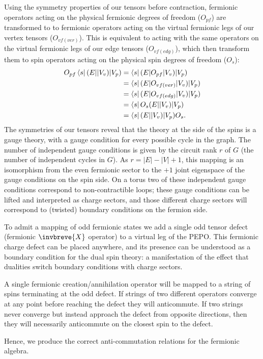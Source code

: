\documentclass[aps,prl,twocolumn,floatfix,10pt,amssymb,amsfont,amsmath,superscriptaddress,float,nofootinbib,longbibliography,nobalancelastpage]{revtex4-2}
\begin{document}
Using the symmetry properties of our tensors before contraction, fermionic operators acting on the physical fermionic degrees of freedom ($O_{pf}$) are transformed to to fermionic operators acting on the virtual fermionic legs of our vertex tensors ($O_{vf (ver)}$). This is equivalent to acting with the same operators on the virtual fermionic legs of our edge tensors ($O_{vf (edg)}$), which then transform them to spin operators acting on the physical spin degrees of freedom ($O_{s}$):
\begin{align*}
    O_{pf}\bra{s}(E|  |V_v)|V_p) &= \bra{s}(E|O_{pf}  |V_v)|V_p)\\
    &= \bra{s}(E| O_{vf (ver)}|V_v)|V_p)\\ 
    &= \bra{s}(E| O_{vf (edg)}|V_v)|V_p)\\
    &= \bra{s}O_s(E| |V_v)|V_p) \\
    &= \bra{s}(E| |V_v)|V_p)O_s.
\end{align*}
The symmetries of our tensors reveal that the theory at the side of the spins is a gauge theory, with a gauge condition for every possible cycle in the graph. The number of independent gauge conditions is given by the circuit rank $r$ of $G$ (the number of independent cycles in $G$). As $r = |E| - |V| + 1$, this mapping is an isomorphism from the even fermionic sector to the $+1$ joint eigenspace of the gauge conditions on the spin side. On a torus two of these independent gauge conditions correspond to non-contractible loops; these gauge conditions can be lifted and interpreted as charge sectors, and those different charge sectors will correspond to (twisted) boundary conditions on the fermion side.


To admit a mapping of odd fermionic states we add a single odd tensor defect (fermionic $\invbreve{X}$ operator) to a virtual leg of the PEPO. This fermionic charge defect can be placed anywhere, and its presence can be understood as a boundary condition for the dual spin theory: a manifestation of the effect that dualities switch boundary conditions with charge sectors. 

A single fermionic creation/annihilation operator will be mapped to a string of spins terminating at the odd defect. If strings of two different operators converge at any point before reaching the defect they will anticommute. If two strings never converge but instead approach the defect from opposite directions, then they will necessarily anticommute on the closest spin to the defect. 

Hence, we produce the correct anti-commutation relations for the fermionic algebra.
\end{document}
